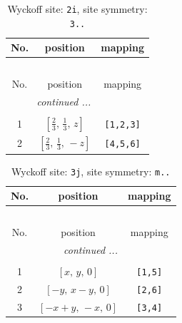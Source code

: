 \documentclass[fleqn,8pt]{jsarticle}
\begin{document}
\renewcommand{\arraystretch}{1.2}
\begin{longtable}{ccc}
\caption{Wyckoff site: {\tt 2i}, site symmetry: {\tt 3..}}
 \\
 \hline \hline
No. & position & mapping \\ \hline \endfirsthead

\multicolumn{2}{l}{\tablename\ \thetable{}} \\
 \hline \hline
No. & position & mapping \\ \hline \endhead

 \hline \hline
\multicolumn{2}{r}{\footnotesize\it continued ...} \\ \endfoot

 \hline \hline
\multicolumn{2}{r}{} \\ \endlastfoot

1 & $\left[ \frac{2}{3},\, \frac{1}{3},\, z \right]$ & {\tt [1,2,3]} \\ \hline
2 & $\left[ \frac{2}{3},\, \frac{1}{3},\, - z \right]$ & {\tt [4,5,6]} \\
\end{longtable}
\renewcommand{\arraystretch}{1.2}
\begin{longtable}{ccc}
\caption{Wyckoff site: {\tt 3j}, site symmetry: {\tt m..}}
 \\
 \hline \hline
No. & position & mapping \\ \hline \endfirsthead

\multicolumn{2}{l}{\tablename\ \thetable{}} \\
 \hline \hline
No. & position & mapping \\ \hline \endhead

 \hline \hline
\multicolumn{2}{r}{\footnotesize\it continued ...} \\ \endfoot

 \hline \hline
\multicolumn{2}{r}{} \\ \endlastfoot

1 & $\left[ x,\, y,\, 0 \right]$ & {\tt [1,5]} \\ \hline
2 & $\left[ - y,\, x - y,\, 0 \right]$ & {\tt [2,6]} \\ \hline
3 & $\left[ - x + y,\, - x,\, 0 \right]$ & {\tt [3,4]} \\
\end{longtable}
\renewcommand{\arraystretch}{1.2}
\end{document}
